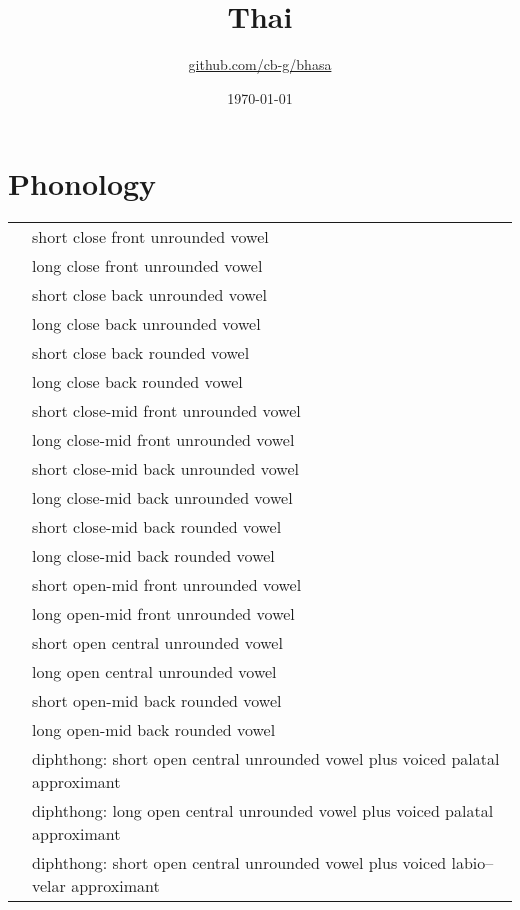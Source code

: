 \documentclass{article}
\title{Thai\\\ipa{[p\super ha:\tone{333}sa:\tone{324}t\super haj\tone{333}]}}
\author{\href{https://github.com/cb-g/bhasa}{github.com/cb-g/bhasa}}
\date{\today}
\begin{document}
\pagecolor{custom_bg}\color{custom_fg}
\maketitle\thispagestyle{empty}

\newpage\setcounter{page}{1}\section{Phonology}

\begin{xltabular}{\textwidth}{lL}
   & short close front unrounded vowel \\
   & long close front unrounded vowel \\
   & short close back unrounded vowel \\
   & long close back unrounded vowel \\
   & short close back rounded vowel \\
   & long close back rounded vowel \\
   & short close-mid front unrounded vowel \\
   & long close-mid front unrounded vowel \\
   & short close-mid back unrounded vowel \\
   & long close-mid back unrounded vowel \\
   & short close-mid back rounded vowel \\
   & long close-mid back rounded vowel \\
   & short open-mid front unrounded vowel \\
   & long open-mid front unrounded vowel \\
   & short open central unrounded vowel \\
   & long open central unrounded vowel \\
   & short open-mid back rounded vowel \\
   & long open-mid back rounded vowel \\
   & diphthong: short open central unrounded vowel plus voiced palatal approximant \\
   & diphthong: long open central unrounded vowel plus voiced palatal approximant \\
   & diphthong: short open central unrounded vowel plus voiced labio–velar approximant \\

\end{xltabular}
\end{document}
